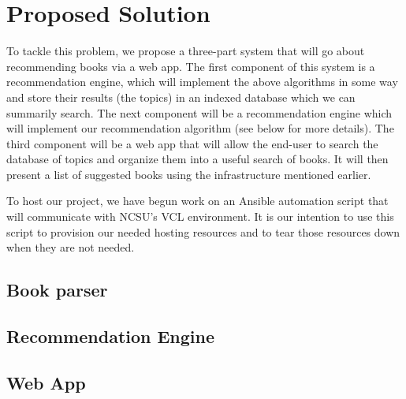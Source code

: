 
\section{Proposed Solution} 
To tackle this problem, we propose a three-part system that will go about recommending books via a web app.  
The first component of this system is a recommendation engine, which will implement the above algorithms in some way and store their results (the topics) in an indexed database which we can summarily search.  
The next component will be a recommendation engine which will implement our recommendation algorithm (see below for more details).  
The third component will be a web app that will allow the end-user to search the database of topics and organize them into a useful search of books.  
It will then present a list of suggested books using the infrastructure mentioned earlier.  

To host our project, we have begun work on an Ansible automation script that will communicate with NCSU's VCL environment.  
It is our intention to use this script to provision our needed hosting resources and to tear those resources down when they are not needed.  
\subsection{Book parser} \label{section:book-parser}


\subsection{Recommendation Engine} \label{section:recommendation_engine}


\subsection{Web App} \label{section:webapp}

